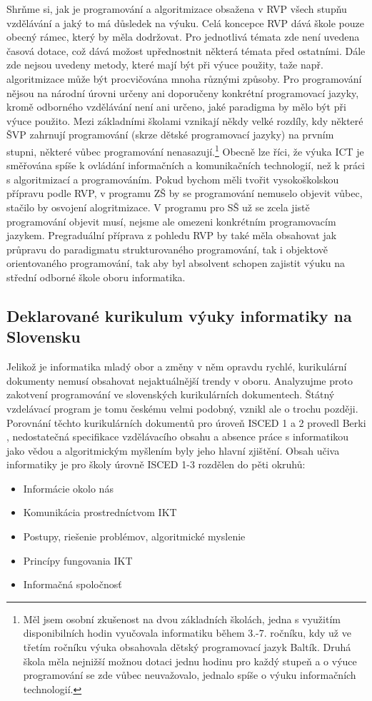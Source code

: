 \documentclass[FP,DP]{tulthesis}
\begin{document}
{{Shrňme si, jak je programování a algoritmizace obsažena v RVP všech stupňu vzdělávání a jaký to má důsledek na výuku.
Celá koncepce RVP dává škole pouze obecný rámec, který by měla dodržovat. Pro jednotlivá témata zde není uvedena časová dotace, což dává možost upřednostnit některá témata před ostatními. Dále zde nejsou uvedeny metody, které mají být při výuce použity, taže např. algoritmizace může být procvičována mnoha různými způsoby.  Pro programování nějsou na národní úrovni určeny ani doporučeny konkrétní programovací jazyky, kromě odborného vzdělávání není ani určeno, jaké paradigma by mělo být při výuce použito. Mezi základními školami vznikají někdy velké rozdíly, kdy některé ŠVP zahrnují programování (skrze dětské programovací jazyky) na prvním stupni, některé vůbec programování nenasazují.\footnote{Měl jsem osobní zkušenost na dvou základních školách, jedna s využitím disponibilních hodin vyučovala informatiku během 3.-7. ročníku, kdy už ve třetím ročníku výuka obsahovala dětský programovací jazyk Baltík. Druhá škola měla nejnižší možnou dotaci jednu hodinu pro každý stupeň a o výuce programování se zde vůbec neuvažovalo, jednalo spíše o výuku informačních technologií.} Obecně lze říci, že výuka ICT je směřována spíše k ovládání informačních a komunikačních technologií, než k práci s algoritmizací a programováním. Pokud bychom měli tvořit vysokoškolskou přípravu podle RVP, v programu ZŠ by se programování nemuselo objevit vůbec, stačilo by osvojení alogritmizace. V programu pro SŠ už se zcela jistě programování objevit musí, nejsme ale omezeni konkrétním programovacím jazykem. Pregraduální příprava z pohledu RVP by také měla obsahovat jak průpravu do paradigmatu strukturovaného programování, tak i objektově orientovaného programování, tak aby byl absolvent schopen zajistit výuku na střední odborné škole oboru informatika.
\subsection{Deklarované kurikulum výuky informatiky na Slovensku}
Jelikož je informatika mladý obor a změny v něm opravdu rychlé, kurikulární dokumenty nemusí obsahovat nejaktuálnější trendy v oboru. Analyzujme  proto zakotvení programování ve slovenských kurikulárních dokumentech. Štátný vzdelávací program je tomu českému velmi podobný, vznikl ale o trochu později. Porovnání těchto kurikulárních dokumentů  pro úroveň ISCED 1 a 2 provedl Berki \citeyearpar{berki2011}, nedostatečná specifikace vzdělávacího obsahu a absence práce s informatikou jako vědou a algoritmickým myšlením byly jeho  hlavní zjištění. \citep[s.~36]{berki2011} Obsah učiva informatiky je pro školy úrovně ISCED 1-3 rozdělen do pěti okruhů:
\begin{itemize}
\setlength\itemsep{0.01em}
  	\item Informácie okolo nás
	\item Komunikácia prostredníctvom IKT
  	\item Postupy, riešenie problémov, algoritmické myslenie
	\item Princípy fungovania IKT
	\item Informačná spoločnosť
\end{itemize}

}}
\end{document}
